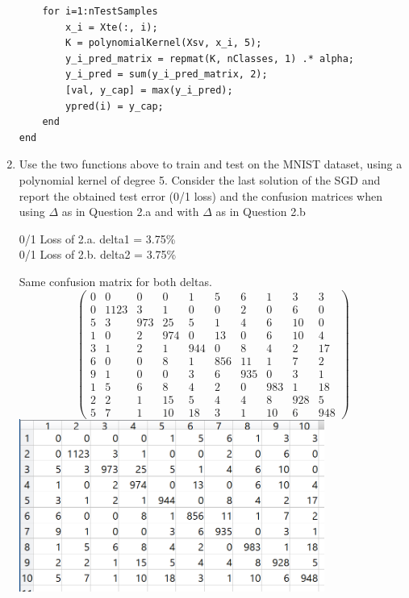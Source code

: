 \documentclass{article}
\begin{document}
\begin{enumerate}[label=(\alph*)]
\begin{verbatim}
    for i=1:nTestSamples
        x_i = Xte(:, i);
        K = polynomialKernel(Xsv, x_i, 5);
        y_i_pred_matrix = repmat(K, nClasses, 1) .* alpha;
        y_i_pred = sum(y_i_pred_matrix, 2);
        [val, y_cap] = max(y_i_pred);
        ypred(i) = y_cap;
    end
end
\end{verbatim}

\item Use the two functions above to train and test on the MNIST dataset, using a polynomial kernel of degree 5. Consider the last solution of the SGD and report the obtained test error (0/1 loss) and the confusion matrices when using $\Delta$ as in Question 2.a and with $\Delta$ as in Question 2.b
\begin{mdframed}[backgroundcolor=lightgray]
0/1 Loss of 2.a. delta1 = 3.75\% \\
0/1 Loss of 2.b. delta2 = 3.75\% \\
\end{mdframed}
Same confusion matrix for both deltas.\\
\[\left(\begin{array}{ccccccccccc} 0&0&0&0&1&5&6&1&3&3\\0&1123&3&1&0&0&2&0&6&0\\5&3&973&25&5&1&4&6&10&0\\1&0&2&974&0&13&0&6&10&4\\3&1&2&1&944&0&8&4&2&17\\6&0&0&8&1&856&11&1&7&2\\9&1&0&0&3&6&935&0&3&1\\1&5&6&8&4&2&0&983&1&18\\2&2&1&15&5&4&4&8&928&5\\5&7&1&10&18&3&1&10&6&948 \end{array}\right)\]
\includegraphics[width=100mm,scale=0.5]{confusionMatrix}


\end{enumerate}
\end{document}
